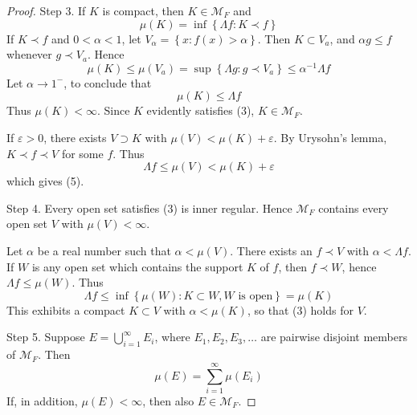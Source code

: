 \documentclass[12pt, a4paper, oneside]{book}
\begin{document}
\begin{theorem}
\begin{proof}
        Step 3. If $K$ is compact, then $K \in \mathcal{M}_F$ and
        \begin{equation*}
            \mu(K)=\inf \left\{\Lambda f: K \prec f\right\}
            \tag{5}
        \end{equation*}
        If $K \prec f$ and $0<\alpha<1$, let $V_\alpha=\left\{x: f(x)>\alpha\right\}$. Then $K \subset V_a$, and $\alpha g \leq f$ whenever $g \prec V_a$. Hence
        \begin{equation*}
            \mu(K) \leq \mu\left(V_a\right)
            =
            \sup \left\{\Lambda g: g \prec V_a\right\} \leq \alpha^{-1} \Lambda f
        \end{equation*}
        Let $\alpha \rightarrow 1^-$, to conclude that
        \begin{equation*}
            \mu(K) \leq \Lambda f
        \end{equation*}
        Thus $\mu(K)<\infty$. Since $K$ evidently satisfies (3), $K \in \mathcal{M}_F$.

        If $\varepsilon>0$, there exists $V \supset K$ with $\mu(V)<\mu(K)+\varepsilon$. By Urysohn's lemma, $K \prec f \prec V$ for some $f$. Thus
        \begin{equation*}
            \Lambda f \leq \mu(V)<\mu(K)+\varepsilon
        \end{equation*}
        which gives (5).

        Step 4. Every open set satisfies (3) is inner regular. Hence $\mathcal{M}_F$ contains every open set $V$ with $\mu(V)<\infty$.

        Let $\alpha$ be a real number such that $\alpha<\mu(V)$. There exists an $f \prec V$ with $\alpha<\Lambda f$. If $W$ is any open set which contains the support $K$ of $f$, then $f \prec W$, hence $\Lambda f \leq \mu(W)$. Thus
        \begin{equation*}
            \Lambda f
            \leq
            \inf \left\{\mu(W) : K \subset W , W \text{ is open}\right\}
            =
            \mu(K)
        \end{equation*}
        This exhibits a compact $K \subset V$ with $\alpha<\mu(K)$, so that (3) holds for $V$.

        Step 5. Suppose $E=\bigcup_{i=1}^{\infty} E_i$, where $E_1, E_2, E_3, \ldots$ are pairwise disjoint members of $\mathcal{M}_F$. Then
        \begin{equation*}
            \mu(E)=\sum_{i=1}^{\infty} \mu\left(E_i\right)
        \end{equation*}
        If, in addition, $\mu(E)<\infty$, then also $E \in \mathcal{M}_F$.


\end{proof}
\end{theorem}
\end{document}

